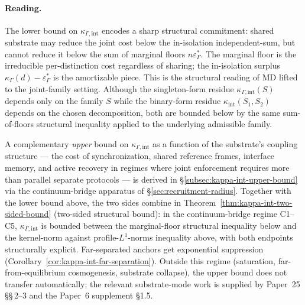 \documentclass[11pt]{article}
\begin{document}
\paragraph{Reading.}
The lower bound on $\kappa_{\Gamma,\mathrm{int}}$ encodes a sharp structural commitment: shared substrate may reduce the joint cost below the in-isolation independent-sum, but cannot reduce it below the sum of marginal floors $n\varepsilon^*_\Gamma$.  The marginal floor is the irreducible per-distinction cost regardless of sharing; the in-isolation surplus $\kappa_\Gamma(d) - \varepsilon^*_\Gamma$ is the amortizable piece.  This is the structural reading of MD lifted to the joint-family setting.  Although the singleton-form residue $\kappa_{\Gamma,\mathrm{int}}(S)$ depends only on the family $S$ while the binary-form residue $\kappa_{\mathrm{int}}(S_1,S_2)$ depends on the chosen decomposition, both are bounded below by the same sum-of-floors structural inequality applied to the underlying admissible family.

A complementary \emph{upper} bound on $\kappa_{\Gamma,\mathrm{int}}$ as a function of the substrate's coupling structure --- the cost of synchronization, shared reference frames, interface memory, and active recovery in regimes where joint enforcement requires more than parallel separate protocols --- is derived in \S\ref{subsec:kappa-int-upper-bound} via the continuum-bridge apparatus of \S\ref{sec:recruitment-radius}.  Together with the lower bound above, the two sides combine in Theorem~\ref{thm:kappa-int-two-sided-bound} (two-sided structural bound): in the continuum-bridge regime C1--C5, $\kappa_{\Gamma,\mathrm{int}}$ is bounded between the marginal-floor structural inequality below and the kernel-norm against profile-$L^1$-norms inequality above, with both endpoints structurally explicit.  Far-separated anchors get exponential suppression (Corollary~\ref{cor:kappa-int-far-separation}).  Outside this regime (saturation, far-from-equilibrium cosmogenesis, substrate collapse), the upper bound does not transfer automatically; the relevant substrate-mode work is supplied by Paper~25 \S\S\,2--3 and the Paper~6 supplement \S1.5.
\end{document}
